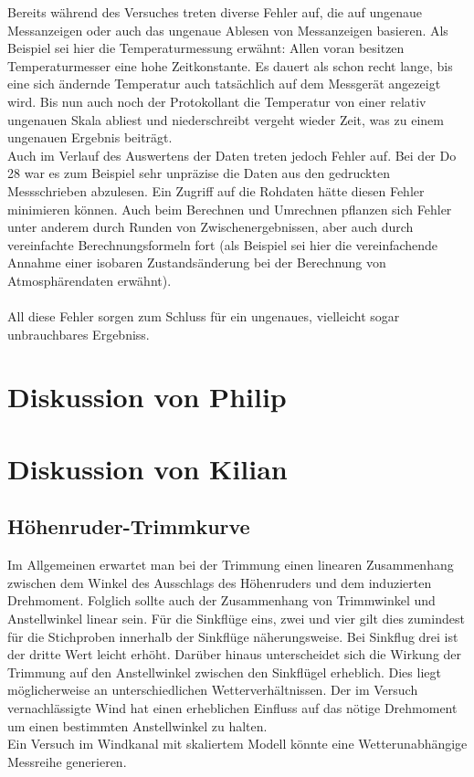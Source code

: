 Bereits während des Versuches treten diverse Fehler auf, die auf ungenaue Messanzeigen oder auch das ungenaue Ablesen von Messanzeigen basieren. Als Beispiel sei hier die Temperaturmessung erwähnt: Allen voran besitzen Temperaturmesser eine hohe Zeitkonstante. Es dauert als schon recht lange, bis eine sich ändernde Temperatur auch tatsächlich auf dem Messgerät angezeigt wird. Bis nun auch noch der Protokollant die Temperatur von einer relativ ungenauen Skala abliest und niederschreibt vergeht wieder Zeit, was zu einem ungenauen Ergebnis beiträgt.\\
Auch im Verlauf des Auswertens der Daten treten jedoch Fehler auf. Bei der Do 28 war es zum Beispiel sehr unpräzise die Daten aus den gedruckten Messschrieben abzulesen. Ein Zugriff auf die Rohdaten hätte diesen Fehler minimieren können. Auch beim Berechnen und Umrechnen pflanzen sich Fehler unter anderem durch Runden von Zwischenergebnissen, aber auch durch vereinfachte Berechnungsformeln fort (als Beispiel sei hier die vereinfachende Annahme einer isobaren Zustandsänderung bei der Berechnung von Atmosphärendaten erwähnt).\\\\
All diese Fehler sorgen zum Schluss für ein ungenaues, vielleicht sogar unbrauchbares Ergebniss.

\newpage

\section{Diskussion von Philip}
\newpage

\section{Diskussion von Kilian}
\subsection{Höhenruder-Trimmkurve}

Im Allgemeinen erwartet man bei der Trimmung einen linearen Zusammenhang zwischen dem Winkel des Ausschlags des Höhenruders und dem induzierten Drehmoment. Folglich sollte auch der Zusammenhang von Trimmwinkel und Anstellwinkel linear sein. Für die Sinkflüge eins, zwei und vier gilt dies zumindest für die Stichproben innerhalb der Sinkflüge näherungsweise. Bei Sinkflug drei ist der dritte Wert leicht erhöht. Darüber hinaus unterscheidet sich die Wirkung der Trimmung auf den Anstellwinkel zwischen den Sinkflügel erheblich. Dies liegt möglicherweise an unterschiedlichen Wetterverhältnissen. Der im Versuch vernachlässigte Wind hat einen erheblichen Einfluss auf das nötige Drehmoment um einen bestimmten Anstellwinkel zu halten.\\
Ein Versuch im Windkanal mit skaliertem Modell könnte eine Wetterunabhängige Messreihe generieren.\\\\

